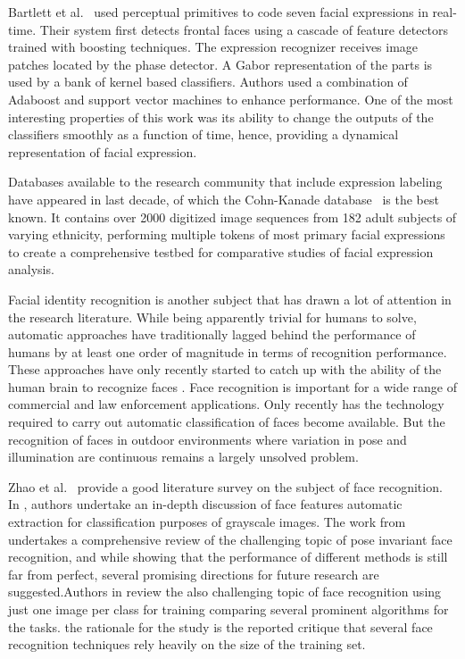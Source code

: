 \documentclass[]{article}
\begin{document}
Bartlett et al.~\cite{Bartlett4624313} used perceptual primitives to code seven facial expressions in real-time. Their system
first detects frontal faces using a cascade of feature detectors trained with boosting techniques. The expression
recognizer receives image patches located by the phase detector. A Gabor representation of the parts is used  by a bank
of kernel based classifiers. Authors used a combination of Adaboost and support vector machines to enhance performance.
One of the most interesting properties of this work was its ability to change the outputs of the classifiers smoothly
as a function of time, hence, providing a dynamical representation of facial expression.

Databases available to the research community that include expression labeling have appeared in last decade, of which
the Cohn-Kanade database~\cite{Cohn840611} is the best known. It contains over 2000 digitized image sequences from  182
adult subjects of varying ethnicity, performing multiple tokens of most primary facial expressions to create a
comprehensive testbed for comparative studies of facial expression analysis.


Facial identity recognition is another subject that has drawn a lot of attention in the research literature. While being
apparently trivial for humans to solve, automatic approaches have traditionally lagged behind the performance of humans
by at least one order of magnitude in terms of recognition performance. These approaches have only recently started to
catch up with the ability of the human brain to recognize faces \cite{onintelligence, Rozado2012b}. Face recognition is
important  for a wide range of commercial and law enforcement applications. Only recently has the technology required to
carry out automatic classification of faces become available. But the recognition of faces in outdoor environments 
where variation in pose and illumination are continuous remains a largely unsolved problem.


Zhao et al.~\cite{Zhao:2003} provide a good literature survey on the subject of face recognition. In
\cite{Craw1987183}, authors undertake an in-depth discussion of face features automatic extraction for classification
purposes of grayscale images. The work from \cite{Zhang20092876} undertakes a comprehensive review  of the challenging
topic of pose invariant face recognition, and while showing that the performance of different methods is still far from
perfect, several promising directions for future research  are suggested.Authors in \cite{Tan20061725} review the also
challenging topic of face recognition using  just one image per class for training comparing several prominent
algorithms for the tasks. the rationale for the study is the reported critique that several face recognition techniques
rely heavily on the size of the training set.
\end{document}
